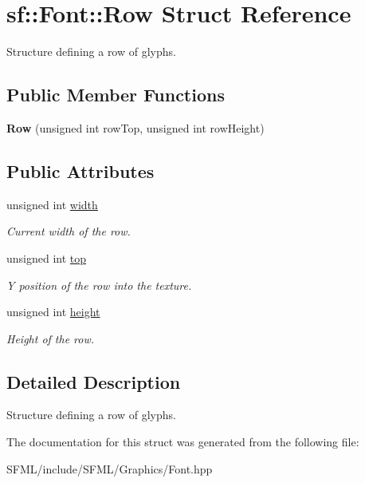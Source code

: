 \hypertarget{structsf_1_1_font_1_1_row}{}\section{sf\+:\+:Font\+:\+:Row Struct Reference}
\label{structsf_1_1_font_1_1_row}


Structure defining a row of glyphs.  


\subsection*{Public Member Functions}
\begin{DoxyCompactItemize}
\item 
\mbox{\label{structsf_1_1_font_1_1_row_a687164fb6d3379578bfbfdde772466ce}} 
{\bfseries Row} (unsigned int row\+Top, unsigned int row\+Height)
\end{DoxyCompactItemize}
\subsection*{Public Attributes}
\begin{DoxyCompactItemize}
\item 
\mbox{\label{structsf_1_1_font_1_1_row_a1c8f9b1ec539530e2005480d7fe16239}} 
unsigned int \mbox{\hyperlink{structsf_1_1_font_1_1_row_a1c8f9b1ec539530e2005480d7fe16239}{width}}
\begin{DoxyCompactList}\small\item\em Current width of the row. \end{DoxyCompactList}\item 
\mbox{\label{structsf_1_1_font_1_1_row_a167288f1fdae3de1113efecb6bb094ef}} 
unsigned int \mbox{\hyperlink{structsf_1_1_font_1_1_row_a167288f1fdae3de1113efecb6bb094ef}{top}}
\begin{DoxyCompactList}\small\item\em Y position of the row into the texture. \end{DoxyCompactList}\item 
\mbox{\label{structsf_1_1_font_1_1_row_a45d788ba76d57cf78b172ce24971086b}} 
unsigned int \mbox{\hyperlink{structsf_1_1_font_1_1_row_a45d788ba76d57cf78b172ce24971086b}{height}}
\begin{DoxyCompactList}\small\item\em Height of the row. \end{DoxyCompactList}\end{DoxyCompactItemize}


\subsection{Detailed Description}
Structure defining a row of glyphs. 

\begin{DoxyVerb}\end{DoxyVerb}
 

The documentation for this struct was generated from the following file\+:\begin{DoxyCompactItemize}
\item 
S\+F\+M\+L/include/\+S\+F\+M\+L/\+Graphics/Font.\+hpp\end{DoxyCompactItemize}
